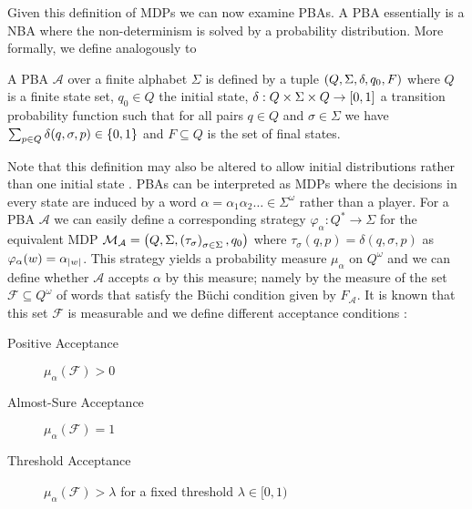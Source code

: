 Given this definition of \acp{MDP} we can now examine \acp{PBA}. A \ac{PBA}
essentially is a \ac{NBA} where the non-determinism is solved by a probability
distribution. More formally, we define analogously to \cite{Groesser}
\begin{definition}
  A \acl{PBA} $\mathcal{A}$ over a finite alphabet $\Sigma$ is defined by a
  tuple $\left(Q, \Sigma, \delta, q_{0}, F\right)$ where $Q$ is a finite state set,
  $q_{0}\in Q$ the initial state,
    $\delta:Q\times\Sigma\times Q\rightarrow \left[0,1\right]$
  a transition probability function such that for all pairs $q\in Q$ and
  $\sigma\in\Sigma$ we have $\sum_{p\in Q}\delta(q,\sigma,p)\in\left\{0,1\right\}$
  and $F\subseteq Q$ is the set of final states.
\end{definition}
Note that this definition may also be altered to allow initial distributions
rather than one initial state \cite{RecOmeLangProbAuto}.
\acp{PBA} can be interpreted as \acp{MDP} where the decisions in every state
are induced by a word $\alpha = \alpha_{1}\alpha_{2}\dots\in\Sigma^{\omega}$
rather than a player. For a \ac{PBA} $\mathcal{A}$ we can easily define a
corresponding strategy $\varphi_{\alpha}:Q^{*}\rightarrow\Sigma$ for the
equivalent \ac{MDP} $\mathcal{M}_{\mathcal{A}} =
   \left(Q, \Sigma, \left(\tau_{\sigma}\right)_{\sigma\in\Sigma}, q_{0}\right)$
where $\tau_{\sigma}(q,p) = \delta(q,\sigma,p)$ as
$\varphi_{\alpha}(w) = \alpha_{\left\vert{w}\right\vert}$. This strategy yields a probability
measure $\mu_{\alpha}$ on $Q^{\omega}$ and we can define whether $\mathcal{A}$ 
accepts $\alpha$ by this measure; namely by the measure of the set
$\mathcal{F}\subseteq Q^{\omega}$ of words that satisfy the Büchi condition
given by $F_{\mathcal{A}}$. It is known that this set $\mathcal{F}$ is
measurable and we define different acceptance conditions \cite{Groesser}:
\begin{description}
  \item [Positive Acceptance] $\mu_{\alpha}(\mathcal{F}) > 0$
  \item [Almost-Sure Acceptance] $\mu_{\alpha}(\mathcal{F}) = 1$
  \item [Threshold Acceptance] $\mu_{\alpha}(\mathcal{F}) > \lambda$ for a
    fixed threshold $\lambda\in[0, 1)$
\end{description}

